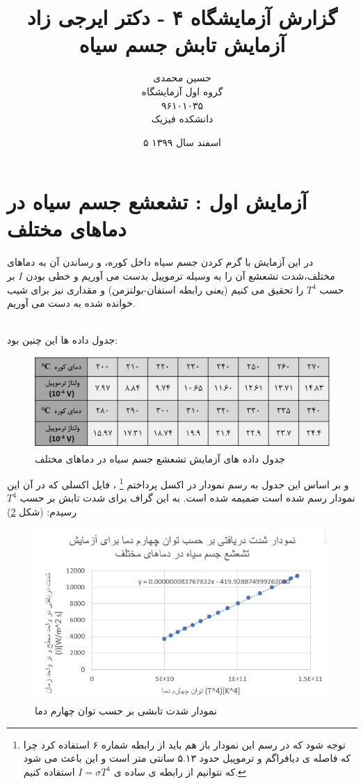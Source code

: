 \documentclass{article}
\title{	
	گزارش آزمایشگاه ۴ - دکتر ایرجی زاد
	\\
	آزمایش تابش جسم سیاه
}
\author{
حسین محمدی 
\LTRfootnote{hossein.mohammadi.00427@gmail.com}
\\
گروه اول آزمایشگاه
\\
۹۶۱۰۱۰۳۵
\\
دانشکده فیزیک
}
\date{۵ اسفند سال ۱۳۹۹}
\begin{document}
\maketitle
\section{آزمایش اول : تشعشع جسم سیاه در دماهای مختلف }
در این  آزمایش با گرم کردن جسم سیاه داخل کوره، و رساندن آن به دماهای مختلف،شدت تشعشع آن را به وسیله ترموپیل بدست می آوریم و خطی بودن 
$I$
بر حسب 
$T^4$
را تحقیق می کنیم (یعنی رابطه استفان-بولتزمن) و مقداری نیز برای شیب خوانده شده به دست می آوریم.

\noindent\\
جدول داده ها این چنین بود:
\begin{figure}[h]
	\centering
	\includegraphics[scale=0.5]{1.png}
	\caption{ جدول داده های آزمایش تشعشع جسم سیاه در دماهای مختلف}
	\label{Fig1}
\end{figure}
  
   و بر اساس این جدول به رسم نمودار در اکسل پرداختم
   \footnote{توجه شود که در رسم این نمودار باز هم باید از رابطه شماره ۶ استفاده کرد چرا که فاصله ی دیافراگم و ترموپیل حدود ۵.۱۳ سانتی متر است و این باعث می شود که نتوانیم از رابطه ی ساده ی 
   $I = \sigma T^4$
   استفاده کنیم.
}
   ، فایل اکسلی که در آن این نمودار رسم شده است ضمیمه شده است. به این گراف برای شدت تابش بر حسب 
   $T^4$
   رسیدم: (شکل \ref{Fig2})
   
      \begin{figure}[h]
   	\centering
   	\includegraphics[scale=1]{2.jpg}
   	\caption{ نمودار شدت تابشی بر حسب توان چهارم دما}
   	\label{Fig2}
   \end{figure}
   
\end{document}
